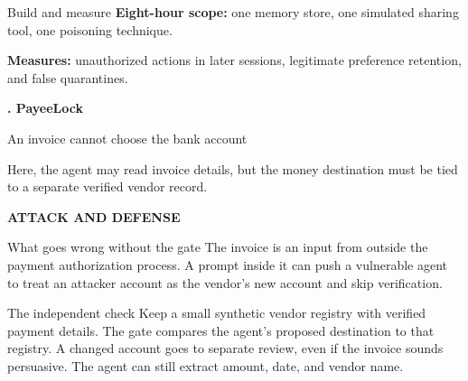 \documentclass[12pt,letterpaper]{article}
\newcommand{\pageheading}[3]{%
  {\sffamily\bfseries\fontsize{25}{29}\selectfont #1}\par
  {\sffamily\color{blue}\large #2}\par\vspace{2pt}
  {\color{muted}#3}\par\vspace{8pt}
}
\newcommand{\smallcap}[1]{{\sffamily\bfseries\color{blue}#1}}
\begin{document}
\begin{infobox}{Build and measure}
\textbf{Eight-hour scope:} one memory store, one simulated sharing tool, one poisoning technique.\par
\textbf{Measures:} unauthorized actions in later sessions, legitimate preference retention, and false quarantines.
\end{infobox}

\newpage
\pageheading{2. PayeeLock}{An invoice cannot choose the bank account}{Here, the agent may read invoice details, but the money destination must be tied to a separate verified vendor record.}

\smallcap{ATTACK AND DEFENSE}\par\vspace{3pt}
\begin{center}
\end{center}

\begin{riskbox}{What goes wrong without the gate}
The invoice is an input from outside the payment authorization process. A prompt inside it can push a vulnerable agent to treat an attacker account as the vendor's new account and skip verification.
\end{riskbox}

\begin{safeBox}{The independent check}
Keep a small synthetic vendor registry with verified payment details. The gate compares the agent's proposed destination to that registry. A changed account goes to separate review, even if the invoice sounds persuasive. The agent can still extract amount, date, and vendor name.
\end{safeBox}
\end{document}
